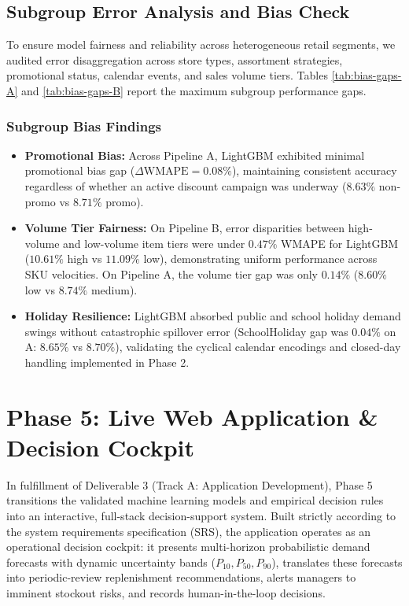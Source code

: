 \documentclass[11pt,a4paper]{article}
\begin{document}
\subsection{Subgroup Error Analysis and Bias Check}
To ensure model fairness and reliability across heterogeneous retail segments, we audited error disaggregation across store types, assortment strategies, promotional status, calendar events, and sales volume tiers. Tables \ref{tab:bias-gaps-A} and \ref{tab:bias-gaps-B} report the maximum subgroup performance gaps.





\subsubsection{Subgroup Bias Findings}
\begin{itemize}
    \item \textbf{Promotional Bias:} Across Pipeline A, LightGBM exhibited minimal promotional bias gap ($\Delta \text{WMAPE} = 0.08\%$), maintaining consistent accuracy regardless of whether an active discount campaign was underway ($8.63\%$ non-promo vs $8.71\%$ promo).
    \item \textbf{Volume Tier Fairness:} On Pipeline B, error disparities between high-volume and low-volume item tiers were under $0.47\%$ WMAPE for LightGBM ($10.61\%$ high vs $11.09\%$ low), demonstrating uniform performance across SKU velocities. On Pipeline A, the volume tier gap was only $0.14\%$ ($8.60\%$ low vs $8.74\%$ medium).
    \item \textbf{Holiday Resilience:} LightGBM absorbed public and school holiday demand swings without catastrophic spillover error (SchoolHoliday gap was $0.04\%$ on A: $8.65\%$ vs $8.70\%$), validating the cyclical calendar encodings and closed-day handling implemented in Phase 2.
\end{itemize}

\FloatBarrier
\newpage

\section{Phase 5: Live Web Application \& Decision Cockpit}

In fulfillment of Deliverable 3 (Track A: Application Development), Phase 5 transitions the validated machine learning models and empirical decision rules into an interactive, full-stack decision-support system. Built strictly according to the system requirements specification (SRS), the application operates as an operational decision cockpit: it presents multi-horizon probabilistic demand forecasts with dynamic uncertainty bands ($P_{10}, P_{50}, P_{90}$), translates these forecasts into periodic-review replenishment recommendations, alerts managers to imminent stockout risks, and records human-in-the-loop decisions.
\end{document}
